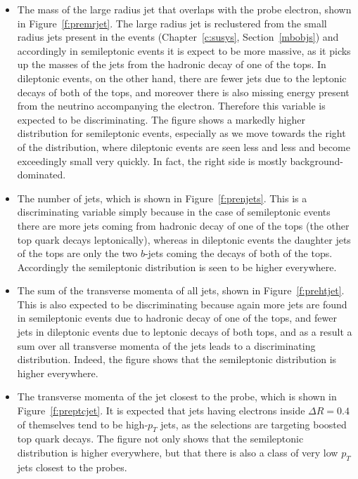 \begin{itemize}[label=]

	\item The mass of the large radius jet that overlaps with the probe electron,
	      shown in Figure~\ref{f:premrjet}. The large radius jet is reclustered from the
	      small radius jets present in the events (Chapter~\ref{c:susys},
	      Section~\ref{mbobjs}) and accordingly in semileptonic events it is expect to be
	      more massive, as it picks up the masses of the jets from the hadronic decay of
	      one of the tops. In dileptonic events, on the other hand, there are fewer jets
	      due to the leptonic decays of both of the tops, and moreover there is also
	      missing energy present from the neutrino accompanying the electron. Therefore
	      this variable is expected to be discriminating. The figure shows a markedly
	      higher distribution for semileptonic events, especially as we move towards the
	      right of the distribution, where dileptonic events are seen less and less and
	      become exceedingly small very quickly. In fact, the right side is mostly
	      background-dominated.


	\item The number of jets, which is shown in Figure~\ref{f:prenjets}. This is a
	      discriminating variable simply because in the case of semileptonic events there
	      are more jets coming from hadronic decay of one of the tops (the other top
	      quark decays leptonically), whereas in dileptonic events the daughter jets of
	      the tops are only the two $b$-jets coming the decays of both of the tops.
	      Accordingly the semileptonic distribution is seen to be higher everywhere.





	\item The sum of the transverse momenta of all jets, shown in
	      Figure~\ref{f:prehtjet}. This is also expected to be discriminating because
	      again more jets are found in semileptonic events due to hadronic decay of one
	      of the tops, and fewer jets in dileptonic events due to leptonic decays of both
	      tops, and as a result a sum over all transverse momenta of the jets leads to a
	      discriminating distribution. Indeed, the figure shows that the semileptonic
	      distribution is higher everywhere.




	\item The transverse momenta of the jet closest to the probe, which is shown in
	      Figure~\ref{f:preptcjet}. It is expected that jets having electrons inside
	      $\Delta R = 0.4$ of themselves tend to be high-$p_T$ jets, as the selections
	      are targeting boosted top quark decays. The figure not only shows that the
	      semileptonic distribution is higher everywhere, but that there is also a class
	      of very low $p_T$ jets closest to the probes.






\end{itemize}

